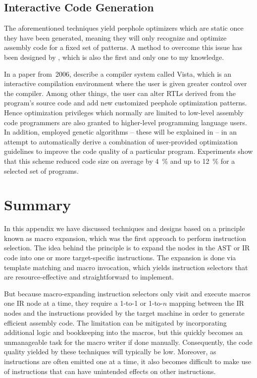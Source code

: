 \subsection{Interactive Code Generation}

The aforementioned techniques yield \glspl{peephole optimizer} which are static
once they have been generated, meaning they will only recognize and optimize
\gls{assembly code} for a fixed set of \glspl{pattern}.
%
A method to overcome this issue has been designed by
\textcite{KulkarniEtAl:2006}, which is also the first and only one to my
knowledge.

In a paper from~2006, \citeauthor{KulkarniEtAl:2006} describe a \gls{compiler}
system called \gls{Vista}, which is an interactive compilation environment where
the user is given greater control over the \gls{compiler}.
%
Among other things, the user can alter \glspl{RTL} derived from the
\gls{program}'s source code and add new customized \gls{peephole optimization}
\glspl{pattern}.
%
Hence optimization privileges which normally are limited to low-level
\gls{assembly code} programmers are also granted to higher-level programming
language users.
%
In addition, \citeauthor{KulkarniEtAl:2006} employed genetic algorithms -- these
will be explained in  -- in an attempt to
automatically derive a combination of user-provided optimization guidelines to
improve the code quality of a particular \gls{program}.
%
Experiments show that this scheme reduced code size on average by
\SI{4}{\percent} and up to \SI{12}{\percent} for a selected set of
\glspl{program}.


\section{Summary}

In this appendix we have discussed techniques and designs based on a
\gls{principle} known as \gls{macro expansion}, which was the first approach to
perform \gls{instruction selection}.
%
The idea behind the \gls{principle} is to expand the \glspl{node} in the
\gls{AST} or \gls{IR} code into one or more target-specific \glspl{instruction}.
%
The expansion is done via \gls{template} matching and \gls{macro} invocation,
which yields \glspl{instruction selector} that are resource-effective and
straightforward to implement.

But because \gls{macro}-expanding \glspl{instruction selector} only visit and
execute \glspl{macro} one \gls{IR} \gls{node} at a time, they require a
\mbox{1-to-1} or \mbox{1-to-$n$} mapping between the \gls{IR} \glspl{node} and
the \glspl{instruction} provided by the \gls{target machine} in order to
generate efficient \gls{assembly code}.
%
The limitation can be mitigated by incorporating additional logic and
bookkeeping into the \glspl{macro}, but this quickly becomes an unmanageable
task for the \gls{macro} writer if done manually.
%
Consequently, the code quality yielded by these techniques will typically be
low.
%
Moreover, as \glspl{instruction} are often emitted one at a time, it also
becomes difficult to make use of \glspl{instruction} that can have unintended
effects on other \glspl{instruction}.

